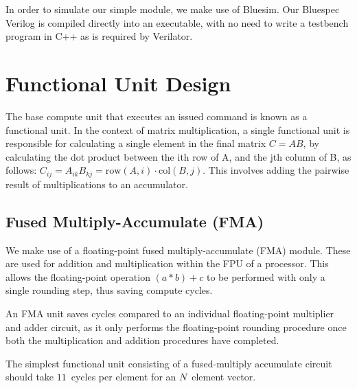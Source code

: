 \documentclass[a4paper,8pt]{report}
\begin{document}
In order to simulate our simple module, we make use of Bluesim. Our Bluespec
Verilog is compiled directly into an executable, with no need to write a
testbench program in C++ as is required by Verilator. 

\section{Functional Unit Design}
The base compute unit that executes an issued command is known as a functional
unit. In the context of matrix multiplication, a single functional unit is
responsible for calculating a single element in the final matrix $C = AB$, by
calculating the dot product between the ith row of A, and the jth column of B,
as follows: $C_{ij} = A_{ik}B_{kj} = \text{row}(A,i) \cdot \text{col}(B,j)$.
This involves adding the pairwise result of multiplications to an accumulator.

\subsection{Fused Multiply-Accumulate (FMA)}
We make use of a floating-point fused multiply-accumulate (FMA) module. These are used
for addition and multiplication within the FPU of a processor. This allows the
floating-point operation $(a*b)+c$ to be performed with only a single rounding
step, thus saving compute cycles.

An FMA unit saves cycles compared to an individual floating-point multiplier and
adder circuit, as it only performs the floating-point rounding procedure once
both the multiplication and addition procedures have completed.

The simplest functional unit consisting of a fused-multiply accumulate circuit
should take $11$~cycles per element for an $N$~element vector.


\end{document}
